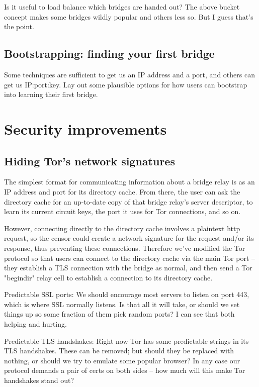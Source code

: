 \documentclass{llncs}
\begin{document}
Is it useful to load balance which bridges are handed out? The above
bucket concept makes some bridges wildly popular and others less so.
But I guess that's the point.

\subsection{Bootstrapping: finding your first bridge}
\label{subsec:first-bridge}

Some techniques are sufficient to get us an IP address and a port,
and others can get us IP:port:key. Lay out some plausible options
for how users can bootstrap into learning their first bridge.

\section{Security improvements}

\subsection{Hiding Tor's network signatures}
\label{subsec:enclave-dirs}

The simplest format for communicating information about a bridge relay
is as an IP address and port for its directory cache. From there, the
user can ask the directory cache for an up-to-date copy of that bridge
relay's server descriptor, to learn its current circuit keys, the port
it uses for Tor connections, and so on.

However, connecting directly to the directory cache involves a plaintext
http request, so the censor could create a network signature for the
request and/or its response, thus preventing these connections. Therefore
we've modified the Tor protocol so that users can connect to the directory
cache via the main Tor port -- they establish a TLS connection with
the bridge as normal, and then send a Tor "begindir" relay cell to
establish a connection to its directory cache.

Predictable SSL ports:
We should encourage most servers to listen on port 443, which is
where SSL normally listens.
Is that all it will take, or should we set things up so some fraction
of them pick random ports? I can see that both helping and hurting.

Predictable TLS handshakes:
Right now Tor has some predictable strings in its TLS handshakes.
These can be removed; but should they be replaced with nothing, or
should we try to emulate some popular browser? In any case our
protocol demands a pair of certs on both sides -- how much will this
make Tor handshakes stand out?
\end{document}
